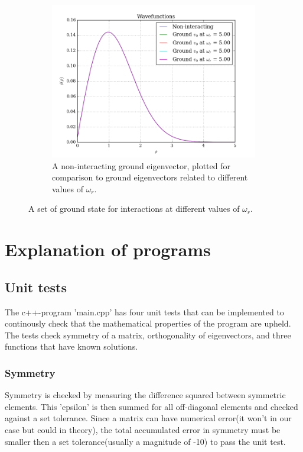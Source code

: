\documentclass[11pt,a4paper,notitlepage]{article}
\begin{document}
\begin{figure}[H]
\begin{subfigure}[t]{0.45\textwidth}
 		\includegraphics[scale=0.40]{../eigvecs_vs_each_other_.png}
 		\caption{A non-interacting ground eigenvector, plotted for comparison to ground eigenvectors related to different values of $\omega_r$.}\label{fig:ground-eigvecs-compare}
 	\end{subfigure}
 	\caption{A set of ground state for interactions at different values of $\omega_r$.}\label{fig:eigvecs-interact}
 \end{figure}

\section{Explanation of programs}
\subsection{Unit tests} \label{sec:unit tests}
The c++-program 'main.cpp' has four unit tests that can be implemented to continously check that the mathematical properties of the program are upheld.
The tests check symmetry of a matrix, orthogonality of eigenvectors, and three functions that have known solutions.
\subsubsection{Symmetry}
Symmetry is checked by measuring the difference squared between symmetric elements. This 'epsilon' is then summed for all off-diagonal elements and checked against a set tolerance.
Since a matrix can have numerical error(it won't in our case but could in theory), the total accumulated error in symmetry must be smaller then a set tolerance(usually a magnitude of -10) to pass the unit test.
\end{document}
